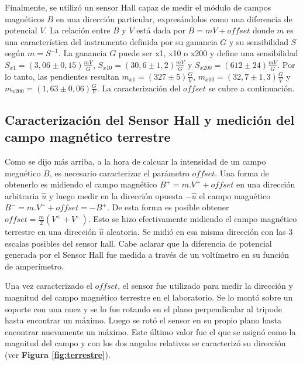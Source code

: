 \documentclass[11pt,a4paper]{article}
\begin{document}
Finalmente, se utilizó un sensor Hall capaz de medir el módulo de campos magnéticos $B$ en una dirección particular, expresándolos como una diferencia de potencial $V$. La relación entre $B$ y $V$ está dada por $B = mV+offset$ donde $m$ es una característica del instrumento definida por su ganancia $G$ y su sensibilidad $S$ según $m = S^{-1}$. La ganancia $G$ puede ser x1, x10 o x200 y define una sensibilidad $S_{x1} = (3,06 \pm 0,15)\frac{mV}{G}$,  $S_{x10} = (30,6 \pm 1,2)\frac{mV}{G}$ y $S_{x200} = (612 \pm 24)\frac{mV}{G}$. Por lo tanto, las pendientes resultan $m_{x1} = (327 \pm 5)\frac{G}{V}$, $m_{x10} = (32,7 \pm 1,3)\frac{G}{V}$ y $m_{x200} = (1,63 \pm 0,06)\frac{G}{V}$. La caracterización del $offset$ se cubre a continuación.

\subsection{Caracterización del Sensor Hall y medición del campo magnético terrestre}

Como se dijo más arriba, a la hora de calcuar la intensidad de un campo megnético $B$, es necesario caracterizar el parámetro $offset$. Una forma de obtenerlo es midiendo el campo magnético $B^{+} = m.V^{+}+offset$ en una dirección arbitraria $\widehat{u}$ y luego medir en la dirección opuesta $-\widehat{u}$ el campo magnético $B^{-} = m.V^{-}+offset=-B^{+}$. De esta forma es posible obtener $offset = \frac{m}{2}(V^{+}+V^{-})$. Esto se hizo efectivamente midiendo el campo magnético terrestre en una dirección $\widehat{u}$ aleatoria. Se midió en esa misma dirección con las 3 escalas posibles del sensor hall. Cabe aclarar que la diferencia de potencial generada por el Sensor Hall fue medida a través de un voltímetro en su función de amperímetro.

Una vez caracterizado el $offset$, el sensor fue utilizado para medir la dirección y magnitud del campo magnético terrestre en el laboratorio. Se lo montó sobre un soporte con una nuez y se lo fue rotando en el plano perpendicular al tripode hasta encontrar un máximo. Luego se rotó el sensor en su propio plano hasta encontrar nuevamente un máximo. Este último valor fue el que se asignó como la magnitud del campo y con los dos angulos relativos se caracterizó su dirección (ver \textbf{Figura \ref{fig:terrestre}}).
\end{document}
